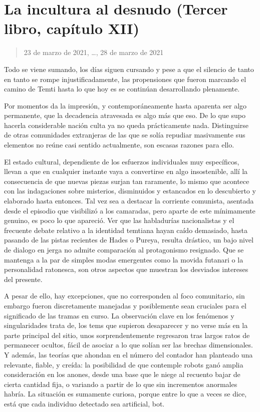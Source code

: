 \documentclass[
]{book}
\begin{document}
\hypertarget{la-incultura-al-desnudo-tercer-libro-capuxedtulo-xii}{%
\section{La incultura al desnudo (Tercer libro, capítulo XII)}\label{la-incultura-al-desnudo-tercer-libro-capuxedtulo-xii}}

\begin{quote}
23 de marzo de 2021, \ldots, 28 de marzo de 2021
\end{quote}

Todo se viene sumando, los días siguen cursando y pese a que el silencio de tanto en tanto se rompe injustificadamente, las propensiones que fueron marcando el camino de Temti hasta lo que hoy es se continúan desarrollando plenamente.

Por momentos da la impresión, y contemporáneamente hasta aparenta ser algo permanente, que la decadencia atravesada es algo más que eso. De lo que supo hacerla considerable nación culta ya no queda prácticamente nada. Distinguirse de otras comunidades extranjeras de las que se solía repudiar masivamente sus elementos no reúne casi sentido actualmente, son escasas razones para ello.

El estado cultural, dependiente de los esfuerzos individuales muy específicos, llevan a que en cualquier instante vaya a convertirse en algo insostenible, allí la consecuencia de que nuevas piezas surjan tan raramente, lo mismo que acontece con las indagaciones sobre misterios, disminuidos y estancados en lo descubierto y elaborado hasta entonces. Tal vez sea a destacar la corriente comunista, asentada desde el episodio que visibilizó a los camaradas, pero aparte de este mínimamente genuino, es poco lo que apareció. Ver que las habladurías nacionalistas y el frecuente debate relativo a la identidad temtiana hayan caído demasiado, hasta pasando de las pistas recientes de Hades o Pureya, resulta drástico, un bajo nivel de dialogo en jerga no admite comparación al protagonismo resignado. Que se mantenga a la par de simples modas emergentes como la movida futanari o la personalidad ratonesca, son otros aspectos que muestran los desviados intereses del presente.

A pesar de ello, hay excepciones, que no corresponden al foco comunitario, sin embargo fueron discretamente manejadas y posiblemente sean cruciales para el significado de las tramas en curso. La observación clave en los fenómenos y singularidades trata de, los tems que supieron desaparecer y no verse más en la parte principal del sitio, unos sorprendentemente regresaron tras largos ratos de permanecer ocultos, fácil de asociar a lo que solían ser las brechas dimensionales. Y además, las teorías que ahondan en el número del contador han planteado una relevante, fiable, y creída: la posibilidad de que contemple robots ganó amplia consideración en los anones, desde una base que le niege al recuento bajar de cierta cantidad fija, o variando a partir de lo que sin incrementos anormales habría. La situación es sumamente curiosa, porque entre lo que a veces se dice, está que cada individuo detectado sea artificial, bot.
\end{document}
